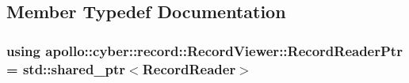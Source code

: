 \subsection{Member Typedef Documentation}
\hypertarget{classapollo_1_1cyber_1_1record_1_1RecordViewer_a70f4191b0d79cbc8d8213f1227fd8609}{
\subsubsection[{Record\-Reader\-Ptr}]{\setlength{\rightskip}{0pt plus 5cm}using {\bf apollo\-::cyber\-::record\-::\-Record\-Viewer\-::\-Record\-Reader\-Ptr} =  std\-::shared\-\_\-ptr$<${\bf Record\-Reader}$>$}}\label{classapollo_1_1cyber_1_1record_1_1RecordViewer_a70f4191b0d79cbc8d8213f1227fd8609}


